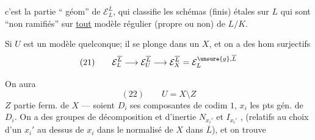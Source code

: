 
c'est la partie `` géom'' de $\mathcal E_L^{\overline L}$,    qui classifie les schémas (finis) étales sur $L$ qui sont ``non ramifiés'' sur \uline{tout} modèle  régulier (propre ou non) de $L/K$.


Si $U$ est un modèle quelconque; il se plonge dans un $X$, et on a des hom surjectifs
\[
(21)\qquad \mathcal E_L^{\overline L}\longrightarrow\mathcal E_U^{\overline L}\longrightarrow\mathcal E_X^{\overline L}=\mathcal E_L^{\unsure{g},\overline L}
\]

On aura 
\[
(22)\qquad U=X\setminus Z
\]
$Z$ partie ferm. de $X$ --- soient $D_i$ ses composantes de codim $1$, $x_i$ les pts gén. de $D_i$. On a des groupes de décomposition et d'inertie $N_{x_i'}$ et $I_{x_i'}$ , (relatifs au choix d'un $x_i'$ au dessus de $x_i$ dans le normalisé de $X$ dans $\overline L$), et on trouve


